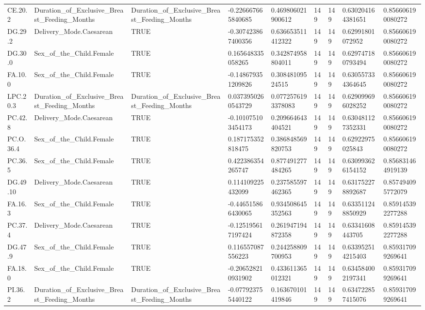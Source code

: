 \begin{longtable}{lllllllll}
CE.20.2 & Duration\_of\_Exclusive\_Breast\_Feeding\_Months & Duration\_of\_Exclusive\_Breast\_Feeding\_Months & -0.226667665840685 & 0.469806021900612 & 149 & 149 & 0.630204164381651 & 0.856606190080272 \\
DG.29.2 & Delivery\_Mode.Caesarean & TRUE & -0.307423867400356 & 0.636653511412322 & 149 & 149 & 0.62991801072952 & 0.856606190080272 \\
DG.30.0 & Sex\_of\_the\_Child.Female & TRUE & 0.165648335058265 & 0.342874958804011 & 149 & 149 & 0.629747180793494 & 0.856606190080272 \\
FA.10.0 & Sex\_of\_the\_Child.Female & TRUE & -0.148679351209826 & 0.30848109524515 & 149 & 149 & 0.630557334364645 & 0.856606190080272 \\
LPC.20.3 & Duration\_of\_Exclusive\_Breast\_Feeding\_Months & Duration\_of\_Exclusive\_Breast\_Feeding\_Months & 0.0373950260543729 & 0.0772576193378083 & 149 & 149 & 0.629099696028252 & 0.856606190080272 \\
PC.42.8 & Delivery\_Mode.Caesarean & TRUE & -0.101075103454173 & 0.209664643404521 & 149 & 149 & 0.630481127352331 & 0.856606190080272 \\
PC.O.36.4 & Sex\_of\_the\_Child.Female & TRUE & 0.187175352818475 & 0.386848569820753 & 149 & 149 & 0.62922975025843 & 0.856606190080272 \\
PC.36.5 & Sex\_of\_the\_Child.Female & TRUE & 0.422386354265747 & 0.877491277484265 & 149 & 149 & 0.630993626154152 & 0.856831464919139 \\
DG.49.10 & Delivery\_Mode.Caesarean & TRUE & 0.114109225432099 & 0.237585597462365 & 149 & 149 & 0.631752278892687 & 0.857494095772079 \\
FA.16.3 & Sex\_of\_the\_Child.Female & TRUE & -0.446515866430065 & 0.934508645352563 & 149 & 149 & 0.633511248850929 & 0.859145392277288 \\
PC.37.4 & Delivery\_Mode.Caesarean & TRUE & -0.125195617197424 & 0.261947194872358 & 149 & 149 & 0.63341608443705 & 0.859145392277288 \\
DG.47.9 & Sex\_of\_the\_Child.Female & TRUE & 0.116557087556223 & 0.244258809700953 & 149 & 149 & 0.633952514215403 & 0.859317099269641 \\
FA.18.0 & Sex\_of\_the\_Child.Female & TRUE & -0.206528210931902 & 0.433611365012321 & 149 & 149 & 0.634584002197341 & 0.859317099269641 \\
PI.36.2 & Duration\_of\_Exclusive\_Breast\_Feeding\_Months & Duration\_of\_Exclusive\_Breast\_Feeding\_Months & -0.077923755440122 & 0.163670101419846 & 149 & 149 & 0.634722857415076 & 0.859317099269641 \\

\end{longtable}
